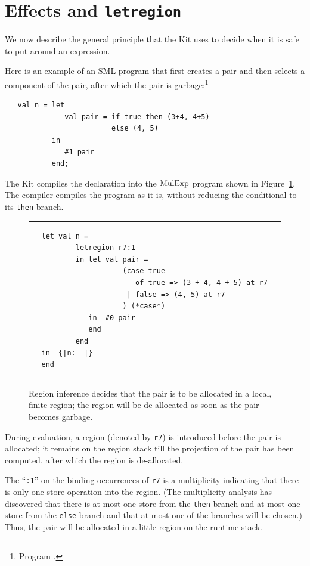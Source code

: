 \documentclass[12pt]{book}
\begin{document}
\section{Effects and {\tt letregion}}
\label{effects.sec}
We now describe the general principle that the Kit uses to decide when
it is safe to put 
%
 around an expression.

Here is an example of an SML program that first creates a pair and
then selects a component of the pair, after which the pair is
garbage:\footnote{Program .}
\begin{verbatim}
   val n = let 
              val pair = if true then (3+4, 4+5) 
                         else (4, 5)
           in 
              #1 pair
           end;
\end{verbatim}
The Kit compiles the declaration into the $\hbox{\rm MulExp}$ program shown in
Figure~\ref{elimpair.fig}.  The compiler compiles the program as it
is, without reducing the conditional to its {\tt then} branch.
\begin{figure}
\hrule\medskip
\begin{verbatim}
   let val n = 
           letregion r7:1 
           in let val pair = 
                      (case true 
                         of true => (3 + 4, 4 + 5) at r7 
                       | false => (4, 5) at r7
                      ) (*case*) 
              in  #0 pair
              end  
           end
   in  {|n: _|}
   end 
\end{verbatim}
\caption{Region inference decides that the pair is to be allocated 
  in a local, finite region; the region will be de-allocated as soon
  as the pair becomes garbage.}  
\medskip\hrule
\label{elimpair.fig}
\end{figure}
During evaluation, a region (denoted by {\tt r7}) is introduced before
the pair is allocated; it remains on the region stack till the
projection of the pair has been computed, after which the region is
de-allocated.

The ``{\tt :1}'' on the binding occurrences of {\tt r7} is a
multiplicity indicating that there is only one store operation into
the region. (The
%
multiplicity analysis has discovered that there is at most one store
from the {\tt then} branch and at most one store from the {\tt else}
branch and that at most one of the branches will be chosen.) Thus, the
pair will be allocated in a little region on the runtime stack.
\end{document}
